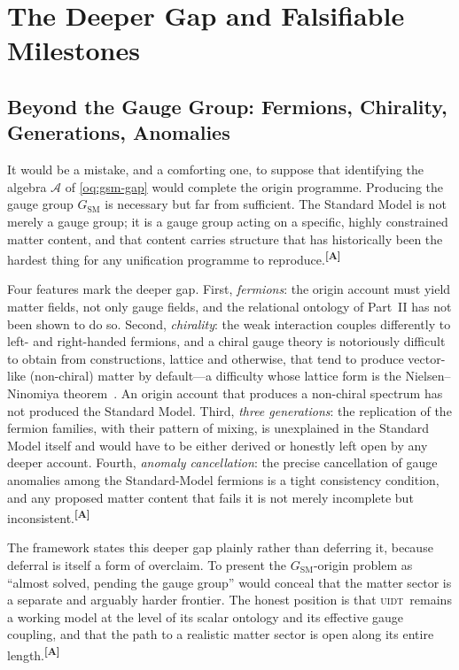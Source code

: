 \documentclass[12pt,a4paper,twoside]{article}
\theoremstyle{plain}
\theoremstyle{definition}
\theoremstyle{remark}
\newcommand{\UIDT}{\textsc{uidt}}
\newcommand{\catmark}[1]{\textsuperscript{\textsf{\textbf{[#1]}}}}
\begin{document}
\section{The Deeper Gap and Falsifiable Milestones}
\label{sec:deeper-gap-milestones}

\subsection{Beyond the Gauge Group: Fermions, Chirality, Generations, Anomalies}
\label{subsec:deeper-gap}

It would be a mistake, and a comforting one, to suppose that identifying the algebra $\mathcal{A}$ of \cref{oq:gsm-gap} would complete the origin programme. Producing the gauge group $G_{\mathrm{SM}}$ is necessary but far from sufficient. The Standard Model is not merely a gauge group; it is a gauge group acting on a specific, highly constrained matter content, and that content carries structure that has historically been the hardest thing for any unification programme to reproduce.\catmark{A}

Four features mark the deeper gap. First, \emph{fermions}: the origin account must yield matter fields, not only gauge fields, and the relational ontology of Part~II has not been shown to do so. Second, \emph{chirality}: the weak interaction couples differently to left- and right-handed fermions, and a chiral gauge theory is notoriously difficult to obtain from constructions, lattice and otherwise, that tend to produce vector-like (non-chiral) matter by default---a difficulty whose lattice form is the Nielsen--Ninomiya theorem~\cite{nielsen1981}. An origin account that produces a non-chiral spectrum has not produced the Standard Model. Third, \emph{three generations}: the replication of the fermion families, with their pattern of mixing, is unexplained in the Standard Model itself and would have to be either derived or honestly left open by any deeper account. Fourth, \emph{anomaly cancellation}: the precise cancellation of gauge anomalies among the Standard-Model fermions is a tight consistency condition, and any proposed matter content that fails it is not merely incomplete but inconsistent.\catmark{A}

The framework states this deeper gap plainly rather than deferring it, because deferral is itself a form of overclaim. To present the $G_{\mathrm{SM}}$-origin problem as ``almost solved, pending the gauge group'' would conceal that the matter sector is a separate and arguably harder frontier. The honest position is that \UIDT\ remains a working model at the level of its scalar ontology and its effective gauge coupling, and that the path to a realistic matter sector is open along its entire length.\catmark{A}
\end{document}
